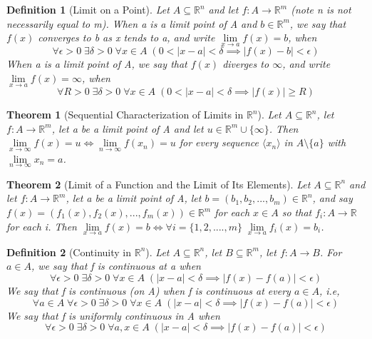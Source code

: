 \documentclass[11pt, oneside]{book}
\theoremstyle{break}
\newtheorem{thm}{Theorem}[section]
\newtheorem{defn}{Definition}[section]
\newcommand{\bb}[1]{\mathbb{#1}}		%
\begin{document}
\begin{defn}[Limit on a Point]
	Let $A \subseteq \bb{R}^n$ and let $f: A \to \bb{R}^m$ (note n is not necessarily equal to m). When a is a limit point of A and $b \in \bb{R}^m$, we say that $f(x)$ converges to b as x tends to a, and write $\lim\limits_{x \to a} f(x) = b$, when
	\begin{equation*}
		\forall \epsilon > 0 \; \exists \delta > 0 \; \forall x \in A \; (0 < |x - a| < \delta \implies |f(x) - b| < \epsilon)
	\end{equation*}
	When a is a limit point of A, we say that $f(x)$ diverges to $\infty$, and write $\lim\limits_{x \to a} f(x) = \infty$, when
	\begin{equation*}
		\forall R > 0 \; \exists \delta > 0 \; \forall x \in A \; (0 < |x - a| < \delta \implies |f(x)| \geq R)
	\end{equation*}
\end{defn}

\begin{thm}[Sequential Characterization of Limits in $\bb{R}^n$]
	Let $A \subseteq \bb{R}^n$, let $f: A \to \bb{R}^m$, let a be a limit point of A and let $u \in \bb{R}^m \cup \{\infty\}$. Then $\lim\limits_{x \to \infty} f(x) = u \iff \lim\limits_{n \to \infty} f(x_n) = u$ for every sequence $\langle x_n \rangle$ in $A \setminus \{a\}$ with $\lim\limits_{n \to \infty} x_n = a$.
\end{thm}

\begin{thm}[Limit of a Function and the Limit of Its Elements]
	Let $A \subseteq \bb{R}^n$ and let $f:A \to \bb{R}^m$, let a be a limit point of A, let $b = (b_1, b_2, ..., b_m) \in \bb{R}^n$, and say $f(x) = (f_1(x), f_2(x), ..., f_m(x)) \in \bb{R}^m$ for each $x \in A$ so that $f_i: A \to \bb{R}$ for each i. Then $\lim\limits_{x \to a} f(x) = b \iff \forall i = \{1, 2, ...., m\}\; \lim\limits_{x \to a} f_i(x) = b_i$.
\end{thm}

\begin{defn}[Continuity in $\bb{R}^n$]
	Let $A \subseteq \bb{R}^n$, let $B \subseteq \bb{R}^m$, let $f: A \to B$. For $a \in A$, we say that f is continuous at a when
	\begin{equation*}
		\forall \epsilon > 0 \; \exists \delta > 0 \; \forall x \in A \; (|x - a| < \delta \implies |f(x) - f(a)| < \epsilon)
	\end{equation*}
	We say that f is continuous (on A) when f is continuous at every $a \in A$, i.e,
	\begin{equation*}
		\forall a \in A \; \forall \epsilon > 0 \; \exists \delta > 0 \; \forall x \in A \; (|x - a| < \delta \implies |f(x) - f(a)| < \epsilon)
	\end{equation*}
	We say that f is uniformly continuous in A when
	\begin{equation}
		\forall \epsilon > 0 \; \exists \delta > 0 \; \forall a, x \in A \; (|x - a| < \delta \implies |f(x) - f(a)| < \epsilon)
	\end{equation}
\end{defn}
\end{document}
